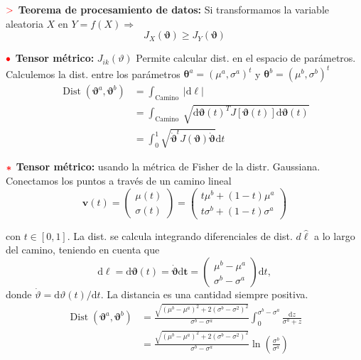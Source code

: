 \documentclass[%
 reprint,
 amsmath,amssymb,
 aps,
]{revtex4-1}
\begin{document}
\textbf{$\textcolor{red}{\mathbf{>}}$ Teorema de procesamiento de datos:}
Si transformamos la variable aleatoria $X$ en $Y=f(X) \Rightarrow$
$$
J_{X}(\boldsymbol{\vartheta}) \geq J_{Y}(\boldsymbol{\vartheta})
$$

\textbf{$\color{red}{\bullet}$ Tensor métrico:} $J_{ik}(\vartheta)$ Permite calcular dist. en el espacio de parámetros. Calculemos la dist.
entre los parámetros $\boldsymbol{\theta}^{a}=\left(\mu^{a}, \sigma^{a}\right)^{t}$ y $\boldsymbol{\theta}^{b}=\left(\mu^{b}, \sigma^{b}\right)^{t}$ 
$$
\begin{aligned}
\operatorname{Dist}\left(\boldsymbol{\vartheta}^{a}, \boldsymbol{\vartheta}^{b}\right) &=\int_{\text {Camino }}|\mathrm{d} \ell| \\
&=\int_{\text {Camino }} \sqrt{\mathrm{d} \boldsymbol{\vartheta}(t)^{T} J[\boldsymbol{\vartheta}(t)] \mathrm{d} \boldsymbol{\vartheta}(t)} \\
&=\int_{0}^{1} \sqrt{\dot{\boldsymbol{\vartheta}}^{t} J(\boldsymbol{\vartheta}) \dot{\boldsymbol{\vartheta}}} \mathrm{d} t
\end{aligned}
$$

\textbf{$\textcolor{red}{\color{red}{\boldsymbol{*}}}$ Tensor métrico:} 
usando la métrica de Fisher de la distr.
Gaussiana. Conectamos los puntos a través de un camino lineal
$$
\boldsymbol{v}(t)=\left(\begin{array}{c}
\mu(t) \\
\sigma(t)
\end{array}\right)=\left(\begin{array}{c}
t \mu^{b}+(1-t) \mu^{a} \\
t \sigma^{b}+(1-t) \sigma^{a}
\end{array}\right)
$$

con $t \in[0,1]$. La dist. se calcula integrando diferenciales
de dist. $d\hat{\ell}$ a lo largo del camino, teniendo en cuenta que
$$
\mathrm{d} \ell=\mathrm{d} \boldsymbol{\vartheta}(t)=\dot{\boldsymbol{\vartheta}} \mathrm{d} \boldsymbol{t}=\left(\begin{array}{c}
\mu^{b}-\mu^{a} \\
\sigma^{b}-\sigma^{a}
\end{array}\right) \mathrm{d} t,
$$
donde $\dot{\vartheta}=\mathrm{d} \vartheta(t) / \mathrm{d} t$. La distancia es una cantidad siempre positiva. 
$$
\begin{aligned}
  \operatorname{Dist}\left(\boldsymbol{\vartheta}^{a}, \boldsymbol{\vartheta}^{b}\right) &=\frac{\sqrt{\left(\mu^{b}-\mu^{a}\right)^{2}+2\left(\sigma^{b}-\sigma^{2}\right)^{2}}}{\sigma^{b}-\sigma^{a}} \int_{0}^{\sigma^{b}-\sigma^{a}} \frac{\mathrm{d} z}{\sigma^{a}+z} \\
&=\frac{\sqrt{\left(\mu^{b}-\mu^{a}\right)^{2}+2\left(\sigma^{b}-\sigma^{2}\right)^{2}}}{\sigma^{b}-\sigma^{a}} \ln \left(\frac{\sigma^{b}}{\sigma^{a}}\right)
\end{aligned}
$$
\end{document}

